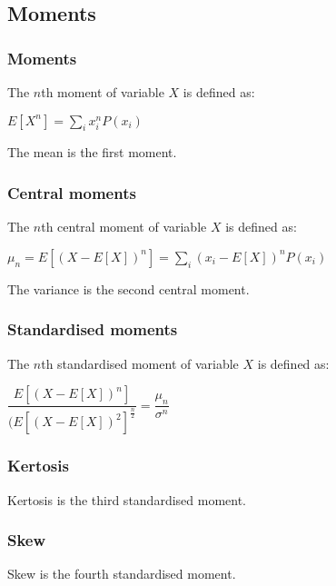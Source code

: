 
\subsection{Moments}

\subsubsection{Moments}

The \(n\)th moment of variable \(X\) is defined as:

\(E[X^n]=\sum_i x_i^n P(x_i)\)

The mean is the first moment.

\subsubsection{Central moments}

The \(n\)th central moment of variable \(X\) is defined as:

\(\mu_n=E[(X-E[X])^n]=\sum_i (x_i-E[X])^n P(x_i)\)

The variance is the second central moment.

\subsubsection{Standardised moments}

The \(n\)th standardised moment of variable \(X\) is defined as:

\(\dfrac{E[(X-E[X])^n]}{(E[(X-E[X])^2]^\frac{n}{2}}=\dfrac{\mu_n}{\sigma^n}\)

\subsubsection{Kertosis}

Kertosis is the third standardised moment.

\subsubsection{Skew}

Skew is the fourth standardised moment.

